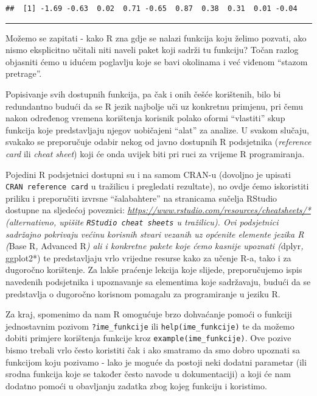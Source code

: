\documentclass[]{book}
\theoremstyle{definition}
\theoremstyle{definition}
\theoremstyle{definition}
\theoremstyle{remark}
\begin{document}
\begin{verbatim}
##  [1] -1.69 -0.63  0.02  0.71 -0.65  0.87  0.38  0.31  0.01 -0.04
\end{verbatim}

\begin{center}\rule{0.5\linewidth}{\linethickness}\end{center}

Možemo se zapitati - kako R zna gdje se nalazi funkcija koju želimo
pozvati, ako nismo eksplicitno učitali niti naveli paket koji sadrži tu
funkciju? Točan razlog objasniti ćemo u idućem poglavlju koje se bavi
okolinama i već viđenom ``stazom pretrage''.

Popisivanje svih dostupnih funkcija, pa čak i onih češće korištenih,
bilo bi redundantno budući da se R jezik najbolje uči uz konkretnu
primjenu, pri čemu nakon određenog vremena korištenja korisnik polako
oformi ``vlastiti'' skup funkcija koje predstavljaju njegov uobičajeni
``alat'' za analize. U svakom slučaju, svakako se preporučuje odabir
nekog od javno dostupnih R podsjetnika (\emph{reference card} ili
\emph{cheat sheet}) koji će onda uvijek biti pri ruci za vrijeme R
programiranja.

Pojedini R podsjetnici dostupni su i na samom CRAN-u (dovoljno je
upisati \texttt{CRAN\ reference\ card} u tražilicu i pregledati
rezultate), no ovdje ćemo iskoristiti priliku i preporučiti izvrsne
``šalabahtere'' na stranicama sučelja RStudio dostupne na sljedećoj
poveznici: \emph{\url{https://www.rstudio.com/resources/cheatsheets/*}
(alternativno, upišite \texttt{RStudio\ cheat\ sheets} u tražilicu). Ovi
podsjetnici sadržajno pokrivaju većinu korisnih stvari vezanih uz
općenite elemente jezika R (}Base R\emph{, }Advanced R\emph{) ali i
konkretne pakete koje ćemo kasnije upoznati (}dplyr\emph{, }ggplot2*) te
predstavljaju vrlo vrijedne resurse kako za učenje R-a, tako i za
dugoročno korištenje. Za lakše praćenje lekcija koje slijede,
preporučujemo ispis navedenih podsjetnika i upoznavanje sa elementima
koje sadržavaju, budući da se predstavlja o dugoročno korisnom pomagalu
za programiranje u jeziku R.

Za kraj, spomenimo da nam R omogućuje brzo dohvaćanje pomoći o funkciji
jednostavnim pozivom \texttt{?ime\_funkcije} ili
\texttt{help(ime\_funkcije)} te da možemo dobiti primjere korištenja
funkcije kroz \texttt{example(ime\_funkcije)}. Ove pozive bismo trebali
vrlo često koristiti čak i ako smatramo da smo dobro upoznati sa
funkcijom koju pozivamo - lako je moguće da postoji neki dodatni
parametar (ili srodna funkcija koje se također često navode u
dokumentaciji) a koji će nam dodatno pomoći u obavljanju zadatka zbog
kojeg funkciju i koristimo.
\end{document}
